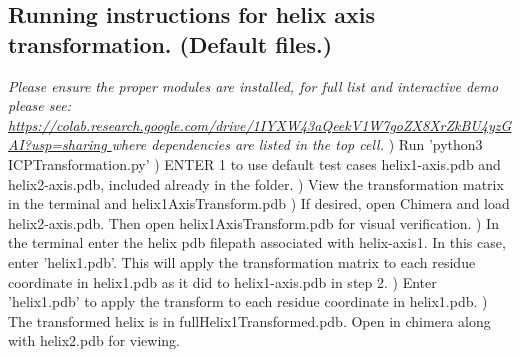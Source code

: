 \documentclass[12pt]{article}
\begin{document}
\subsection*{Running instructions for helix axis transformation. (Default files.)}
\emph{\newline Please ensure the proper modules are installed, for full list and interactive demo please see: \url{https://colab.research.google.com/drive/1IYXW43aQeekV1W7goZX8XrZkBU4yzGAI?usp=sharing } where dependencies are listed in the top cell.}
\newline{}) Run 'python3 ICPTransformation.py'
) ENTER 1 to use default test cases helix1-axis.pdb and helix2-axis.pdb, included already in the folder.
) View the transformation matrix in the terminal and helix1AxisTransform.pdb
) If desired, open Chimera and load helix2-axis.pdb.  Then open helix1AxisTransform.pdb for visual verification.
) In the terminal enter the helix pdb filepath associated with helix-axis1.  In this case, enter 'helix1.pdb'. This will apply the transformation matrix to each residue coordinate in helix1.pdb as it did to helix1-axis.pdb in step 2.
) Enter 'helix1.pdb' to apply the transform to each residue coordinate in helix1.pdb.
) The transformed helix is in fullHelix1Transformed.pdb.  Open in chimera along with helix2.pdb for viewing.
\end{document}
